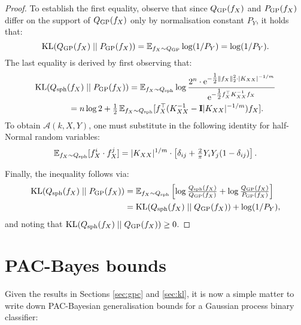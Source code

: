 \begin{refsection}
\begin{proof}
To establish the first equality, observe that since $Q_\mathrm{GP}(f_X)$ and $P_\mathrm{GP}(f_X)$ differ on the support of $Q_\mathrm{GP}(f_X)$ only by normalisation constant $P_Y$, it holds that:
\begin{equation*}
    \mathrm{KL}(Q_{\mathrm{GP}}(f_X) \;||\; P_{\mathrm{GP}}(f_X)) = \operatorname{\mathbb{E}}_{f_X\sim Q_{\mathrm{GP}}} \log(1/P_Y)= \log (1/P_Y).
\end{equation*}
The last equality is derived by first observing that:
\begin{align*}
    &\mathrm{KL}(Q_\mathrm{sph} (f_X) \;||\; P_\mathrm{GP}(f_X)) = \operatorname{\mathbb{E}}_{f_X \sim Q_\mathrm{sph}} \log \frac{2^n\cdot\mathrm{e}^{-\tfrac{1}{2}\Vert {f_X} \Vert_2^2\cdot\vert {K_{XX}} \vert^{-1/m}}}{\mathrm{e}^{-\tfrac{1}{2} f_X^\top K_{XX}^{-1}f_X}} \\
    &\qquad\qquad= n \log 2 + \tfrac{1}{2} \operatorname{\mathbb{E}}_{f_X \sim Q_\mathrm{sph}} [f_X^\top (K_{XX}^{-1} - \mathbf{I}\vert {K_{XX}} \vert^{-1/m})f_X].
\end{align*}
To obtain $\mathcal{A}(k,X,Y)$, one must substitute in the following identity for half-Normal random variables:
\begin{gather*}
    \operatorname{\mathbb{E}}_{f_X \sim Q_\mathrm{sph}}[f_X^i\cdot f_X^j] = \vert {K_{XX}} \vert^{1/m}\cdot\left[\delta_{ij} + \tfrac{2}{\pi} Y_i Y_j (1-\delta_{ij})\right].
\end{gather*}

Finally, the inequality follows via:
\begin{align*}
    \mathrm{KL}(Q_\mathrm{sph}(f_X)\;||\;P_\mathrm{GP}(f_X)) &= \operatorname{\mathbb{E}}_{f_X\sim Q_\mathrm{sph}}\left[\log\tfrac{Q_\mathrm{sph}(f_X)}{Q_\mathrm{GP}(f_X)} + \log\tfrac{Q_\mathrm{GP}(f_X)}{P_\mathrm{GP}(f_X)}\right]\\
    &= \mathrm{KL}(Q_\mathrm{sph}(f_X)\;||\;Q_\mathrm{GP}(f_X)) + \log(1/P_Y),
\end{align*}
and noting that $\mathrm{KL}(Q_\mathrm{sph}(f_X)\;||\;Q_\mathrm{GP}(f_X)) \geq 0$.
\end{proof}

\section{PAC-Bayes bounds}

Given the results in Sections \ref{sec:gpc} and \ref{sec:kl}, it is now a simple matter to write down PAC-Bayesian generalisation bounds for a Gaussian process binary classifier:


\end{refsection}
